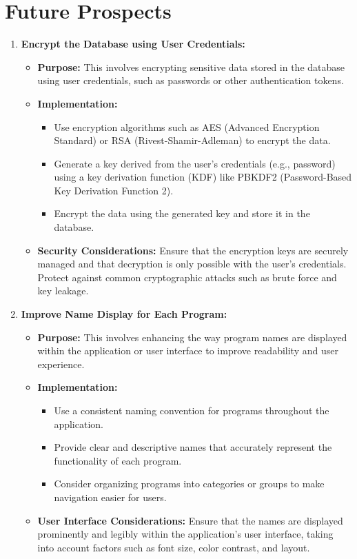 \documentclass[openany]{report}
\begin{document}
\chapter{Future Prospects}
\begin{enumerate}
    \item \textbf{Encrypt the Database using User Credentials:}
          \begin{itemize}
              \item \textbf{Purpose:} This involves encrypting sensitive data stored in the database using user credentials, such as passwords or other authentication tokens.
              \item \textbf{Implementation:}
                    \begin{itemize}
                        \item Use encryption algorithms such as AES (Advanced Encryption Standard) or RSA (Rivest-Shamir-Adleman) to encrypt the data.
                        \item Generate a key derived from the user's credentials (e.g., password) using a key derivation function (KDF) like PBKDF2 (Password-Based Key Derivation Function 2).
                        \item Encrypt the data using the generated key and store it in the database.
                    \end{itemize}
              \item \textbf{Security Considerations:} Ensure that the encryption keys are securely managed and that decryption is only possible with the user's credentials. Protect against common cryptographic attacks such as brute force and key leakage.
          \end{itemize}

    \item \textbf{Improve Name Display for Each Program:}
          \begin{itemize}
              \item \textbf{Purpose:} This involves enhancing the way program names are displayed within the application or user interface to improve readability and user experience.
              \item \textbf{Implementation:}
                    \begin{itemize}
                        \item Use a consistent naming convention for programs throughout the application.
                        \item Provide clear and descriptive names that accurately represent the functionality of each program.
                        \item Consider organizing programs into categories or groups to make navigation easier for users.
                    \end{itemize}
              \item \textbf{User Interface Considerations:} Ensure that the names are displayed prominently and legibly within the application's user interface, taking into account factors such as font size, color contrast, and layout.
          \end{itemize}


\end{enumerate}
\end{document}
